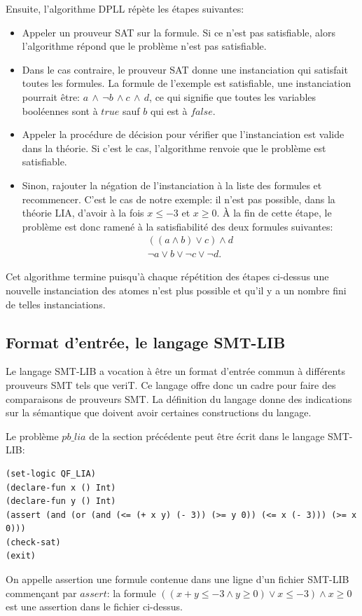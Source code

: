 \documentclass[11pt]{article}
\begin{document}
Ensuite, l'algorithme DPLL répète les étapes suivantes:
\begin{itemize}
\item Appeler un prouveur SAT sur la formule. Si ce n'est pas satisfiable, alors l'algorithme répond que le problème n'est pas satisfiable.
\item Dans le cas contraire, le prouveur SAT donne une instanciation qui satisfait toutes les formules. La formule de l'exemple est satisfiable, une instanciation pourrait être:
  $a \, \wedge\,\neg b \, \wedge c\, \wedge \,d$,
ce qui signifie que toutes les variables booléennes sont à $true$ sauf $b$ qui est à $false$.
\item Appeler la procédure de décision pour vérifier que l'instanciation est valide dans la théorie. Si c'est le cas, l'algorithme renvoie que le problème est satisfiable.
\item Sinon, rajouter la négation de l'instanciation à la liste des formules et recommencer. C'est le cas de notre exemple: il n'est pas possible, dans la théorie LIA, d'avoir à la fois $x \leq -3$ et $x \geq 0$. À la fin de cette étape, le problème est donc ramené à la satisfiabilité des deux formules suivantes:
  \begin{align*}
    ((a \wedge b) \vee c) \wedge d \\
    \neg a \vee b \vee \neg c \vee \neg d.
  \end{align*}
\end{itemize}

Cet algorithme termine puisqu'à chaque répétition des étapes ci-dessus une nouvelle instanciation des atomes n'est plus possible et qu'il y a un nombre fini de telles instanciations. 

\subsection{Format d'entrée, le langage SMT-LIB} \label{smt-lib}

Le langage SMT-LIB a vocation à être un format d'entrée commun à différents prouveurs SMT tels que veriT. Ce langage offre donc un cadre pour faire des comparaisons de prouveurs SMT. La définition du langage \cite{smtlib} donne des indications sur la sémantique que doivent avoir certaines constructions du langage.\medbreak

Le problème $pb\_lia$ de la section précédente peut être écrit dans le langage SMT-LIB:
\begin{lstlisting}[frame=no]
(set-logic QF_LIA)
(declare-fun x () Int)
(declare-fun y () Int)
(assert (and (or (and (<= (+ x y) (- 3)) (>= y 0)) (<= x (- 3))) (>= x 0)))
(check-sat)
(exit)
\end{lstlisting}
On appelle assertion une formule contenue dans une ligne d'un fichier SMT-LIB commençant par $assert$: la formule $((x + y \leq -3 \wedge y \geq 0) \vee x \leq -3) \wedge x \geq 0$ est une assertion dans le fichier ci-dessus.
\end{document}
